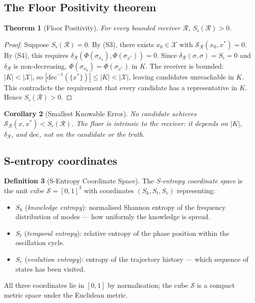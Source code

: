 \documentclass[twocolumn,10pt,a4paper]{article}
\theoremstyle{thmstyle}
\newtheorem{theorem}{Theorem}[section]
\newtheorem{corollary}[theorem]{Corollary}
\theoremstyle{definition}
\newtheorem{definition}[theorem]{Definition}
\theoremstyle{remark}
\newcommand{\Sfl}{S_{\flat}}
\newcommand{\Sk}{S_{k}}
\newcommand{\St}{S_{t}}
\newcommand{\Se}{S_{e}}
\newcommand{\Sspace}{\mathcal{S}}
\newcommand{\receiver}{\mathcal{R}}
\begin{document}
\subsection{The Floor Positivity theorem}

\begin{theorem}[Floor Positivity]
\label{thm:floor}
For every bounded receiver $\receiver$, $\Sfl(\receiver) > 0$.
\end{theorem}

\begin{proof}
Suppose $\Sfl(\receiver) = 0$. By (S3), there exists $x_0 \in \mathcal{X}$
with $\mathcal{S}_\receiver(x_0, x^*) = 0$. By (S4), this requires
$\delta_\receiver(\Phi(\sigma_{x_0}), \Phi(\sigma_{x^*})) = 0$.
Since $\delta_\receiver(\sigma,\sigma) = \Sfl = 0$ and $\delta_\receiver$ is
non-decreasing, $\Phi(\sigma_{x_0}) = \Phi(\sigma_{x^*})$ in $K$.
The receiver is bounded: $|K| < |\mathcal{X}|$, so
$|\mathrm{dec}^{-1}(\{x^*\})| \leq |K| < |\mathcal{X}|$, leaving
candidates unreachable in $K$. This contradicts the requirement that every
candidate has a representative in $K$. Hence $\Sfl(\receiver) > 0$.
\end{proof}

\begin{corollary}[Smallest Knowable Error]
\label{cor:floor}
No candidate achieves $\mathcal{S}_\receiver(x, x^*) < \Sfl(\receiver)$.
The floor is intrinsic to the receiver: it depends on $|K|$, $\delta_\receiver$,
and $\mathrm{dec}$, not on the candidate or the truth.
\end{corollary}

\subsection{S-entropy coordinates}

\begin{definition}[S-Entropy Coordinate Space]
\label{def:sentropy}
The \emph{S-entropy coordinate space} is the unit cube
$\Sspace = [0,1]^3$ with coordinates $(\Sk, \St, \Se)$ representing:
\begin{itemize}[nosep]
\item $\Sk$ (\emph{knowledge entropy}): normalised Shannon entropy of the
frequency distribution of modes — how uniformly the knowledge is spread.
\item $\St$ (\emph{temporal entropy}): relative entropy of the phase position
within the oscillation cycle.
\item $\Se$ (\emph{evolution entropy}): entropy of the trajectory history —
which sequence of states has been visited.
\end{itemize}
All three coordinates lie in $[0,1]$ by normalisation; the cube $\Sspace$
is a compact metric space under the Euclidean metric.
\end{definition}
\end{document}
